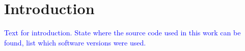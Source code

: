 \section{Introduction}
\textcolor{Blue}{Text for introduction. State where the source code used in this work can be found, list which software versions were used.}